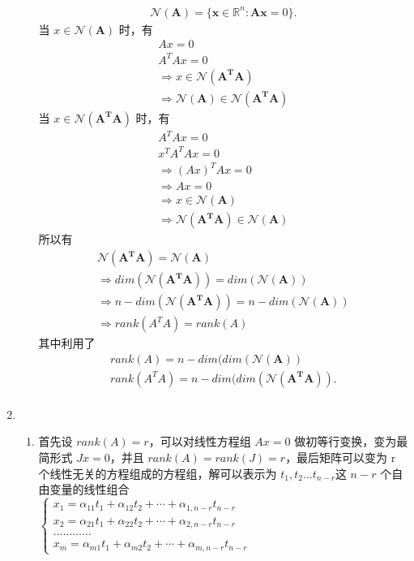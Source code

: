 \begin{solution}
\begin{enumerate}
\begin{enumerate}
			\begin{align*}
			\mathcal{N}(\mathbf{A})  = \{ \mathbf{x}\in \mathbb{R}^n : \mathbf{Ax}=0\}.
			\end{align*}
			当 $x \in \mathcal{N}(\mathbf{A})$ 时，有
			\begin{align*}
				Ax = 0\\
			A^TAx = 0\\
			 \Rightarrow x \in \mathcal{N}(\mathbf{A^TA})\\
			 \Rightarrow \mathcal{N}(\mathbf{A}) \in \mathcal{N}(\mathbf{A^TA})
			\end{align*}
			当 $x \in \mathcal{N}(\mathbf{A^TA})$ 时，有
			\begin{align*}
			A^TAx = 0\\
			x^TA^TAx = 0\\
			\Rightarrow (Ax)^TAx = 0\\
			\Rightarrow Ax = 0\\
			\Rightarrow x \in \mathcal{N}(\mathbf{A})\\
			\Rightarrow \mathcal{N}(\mathbf{A^TA}) \in \mathcal{N}(\mathbf{A})
			\end{align*}
			所以有
			\begin{align*}
			\mathcal{N}(\mathbf{A^TA}) = \mathcal{N}(\mathbf{A})\\
			\Rightarrow dim(\mathcal{N}(\mathbf{A^TA})) = dim(\mathcal{N}(\mathbf{A}))\\
			\Rightarrow n - dim(\mathcal{N}(\mathbf{A^TA})) = n - dim(\mathcal{N}(\mathbf{A}))\\
			\Rightarrow rank(A^TA) = rank(A)
			\end{align*}
			其中利用了
			\begin{align*}
			rank(A) = n - dim(dim(\mathcal{N}(\mathbf{A}))\\
			rank(A^TA) = n - dim(dim(\mathcal{N}(\mathbf{A^TA})).\\
			\end{align*}
		\end{enumerate}
		\item \ \\
		\begin{enumerate}
			\item 首先设 $rank(A) = r$，可以对线性方程组 $Ax = 0$ 做初等行变换，变为最简形式 $ Jx = 0$，并且 $rank(A) = rank(J) = r$，最后矩阵可以变为 r 个线性无关的方程组成的方程组，解可以表示为 $ t_1, t_2\dots t_{n - r} $这 $n - r$ 个自由变量的线性组合\\
			$\left\{\begin{array}{l}{x_{1}=\alpha_{11} t_{1}+\alpha_{12} t_{2}+\cdots+\alpha_{1, n-r} t_{n-r}} \\ {x_{2}=\alpha_{21} t_{1}+\alpha_{22} t_{2}+\cdots+\alpha_{2, n-r} t_{n-r}} \\ {\ldots \ldots \ldots \ldots} \\ {x_{m}=\alpha_{m 1} t_{1}+\alpha_{m 2} t_{2}+\cdots+\alpha_{m, n-r} t_{n-r}}\end{array}\right.$\\

\end{enumerate}
\end{enumerate}
\end{solution}
